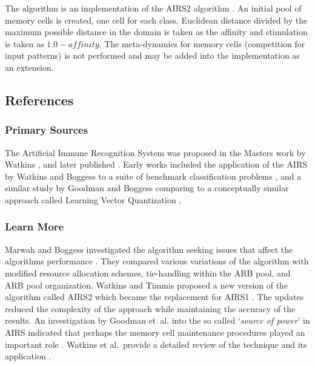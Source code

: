 The algorithm is an implementation of the AIRS2 algorithm \cite{Watkins2002b}. An initial pool of memory cells is created, one cell for each class. Euclidean distance divided by the maximum possible distance in the domain is taken as the affinity and stimulation is taken as $1.0-affinity$. The meta-dynamics for memory cells (competition for input patterns) is not performed and may be added into the implementation as an extension.



\subsection{References}

% 
% 
\subsubsection{Primary Sources}
The Artificial Immune Recognition System was proposed in the Masters work by Watkins \cite{Watkins2001}, and later published \cite{Watkins2002a}.
Early works included the application of the AIRS by Watkins and Boggess to a suite of benchmark classification problems \cite{Watkins2002}, and a similar study by Goodman and Boggess comparing to a conceptually similar approach called Learning Vector Quantization \cite{Goodman2002}.

% 
% 
\subsubsection{Learn More}
Marwah and Boggess investigated the algorithm seeking issues that affect the algorithms performance \cite{Marwah2002}. They compared various variations of the algorithm with modified resource allocation schemes, tie-handling within the ARB pool, and ARB pool organization.
Watkins and Timmis proposed a new version of the algorithm called AIRS2 which became the replacement for AIRS1 \cite{Watkins2002b}. The updates reduced the complexity of the approach while maintaining the accuracy of the results. An investigation by Goodman et~al. into the so called `\emph{source of power}' in AIRS indicated that perhaps the memory cell maintenance procedures played an important role \cite{Goodman2003}.
Watkins et al.\ provide a detailed review of the technique and its application \cite{Watkins2004a}.


